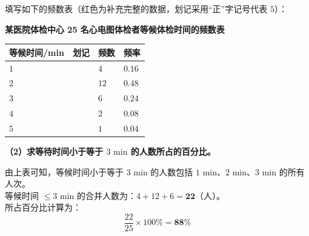 填写如下的频数表（红色为补充完整的数据，划记采用“正”字记号代表 $5$）：

\vspace{0.2cm}
\begin{center}
\textbf{某医院体检中心 25 名心电图体检者等候体检时间的频数表} \\
\vspace{0.2cm}
\renewcommand{\arraystretch}{1.5}
\begin{tabular}{|>{\centering\arraybackslash}p{3cm}|>{\centering\arraybackslash}p{3.5cm}|>{\centering\arraybackslash}p{2.5cm}|>{\centering\arraybackslash}p{2.5cm}|}
  \hline
  \cellcolor{gray!15} 等候时间/min & \cellcolor{gray!15} 划记 & \cellcolor{gray!15} 频数 & \cellcolor{gray!15} 频率 \\
  \hline
  $1$ & \textbf{\textcolor{red!70!black}{\zhengIV{}}} & \textbf{\textcolor{red!70!black}{$4$}} & \textbf{\textcolor{red!70!black}{$0.16$}} \\
  \hline
  $2$ & \textbf{\textcolor{red!70!black}{\zhengV{} \quad \zhengV{} \quad \zhengII{}}} & \textbf{\textcolor{red!70!black}{$12$}} & \textbf{\textcolor{red!70!black}{$0.48$}} \\
  \hline
  $3$ & \textbf{\textcolor{red!70!black}{\zhengV{} \quad \zhengI{}}} & \textbf{\textcolor{red!70!black}{$6$}} & \textbf{\textcolor{red!70!black}{$0.24$}} \\
  \hline
  $4$ & \textbf{\textcolor{red!70!black}{\zhengII{}}} & \textbf{\textcolor{red!70!black}{$2$}} & \textbf{\textcolor{red!70!black}{$0.08$}} \\
  \hline
  $5$ & \textbf{\textcolor{red!70!black}{\zhengI{}}} & \textbf{\textcolor{red!70!black}{$1$}} & \textbf{\textcolor{red!70!black}{$0.04$}} \\
  \hline
\end{tabular}
\end{center}

\vspace{0.6cm}

\textbf{（2）求等待时间小于等于 $3\text{ min}$ 的人数所占的百分比。}

\vspace{0.2cm}

由上表可知，等候时间小于等于 $3\text{ min}$ 的人数包括 $1\text{ min}$、$2\text{ min}、3\text{ min}$ 的所有人次。\\
等候时间 $\leqslant 3\text{ min}$ 的合并人数为：$4 + 12 + 6 = \boldsymbol{22}$（人）。\\
所占百分比计算为：
$$ \frac{22}{25} \times 100\% = \boldsymbol{88\%} $$

